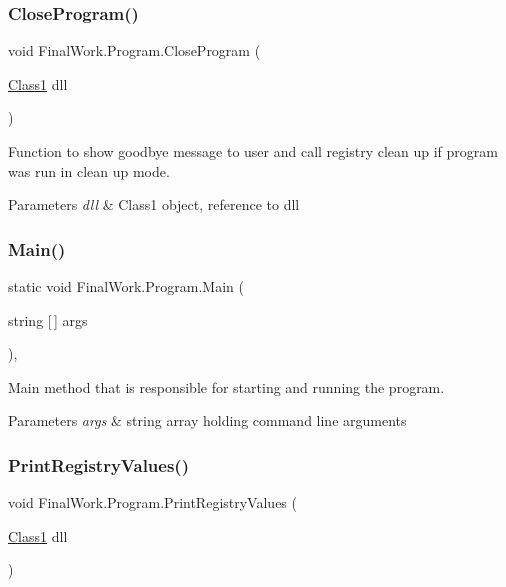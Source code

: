 \subsubsection{\texorpdfstring{Close\+Program()}{CloseProgram()}}
{\footnotesize\ttfamily void Final\+Work.\+Program.\+Close\+Program (\begin{DoxyParamCaption}\item[{\hyperlink{class_projectdll_1_1_class1}{Class1}}]{dll }\end{DoxyParamCaption})\hspace{0.3cm}{\ttfamily [private]}}

Function to show goodbye message to user and call registry clean up if program was run in clean up mode. 
\begin{DoxyParams}{Parameters}
{\em dll} & Class1 object, reference to dll \\
\hline
\end{DoxyParams}
\mbox{\label{class_final_work_1_1_program_af638f741e19f626809c2bf6f2a028e83}} 
\subsubsection{\texorpdfstring{Main()}{Main()}}
{\footnotesize\ttfamily static void Final\+Work.\+Program.\+Main (\begin{DoxyParamCaption}\item[{string \mbox{[}$\,$\mbox{]}}]{args }\end{DoxyParamCaption})\hspace{0.3cm}{\ttfamily [static]}, {\ttfamily [private]}}

Main method that is responsible for starting and running the program. 
\begin{DoxyParams}{Parameters}
{\em args} & string array holding command line arguments \\
\hline
\end{DoxyParams}
\mbox{\label{class_final_work_1_1_program_ae645f04225fb80add67841029cdf6594}} 
\subsubsection{\texorpdfstring{Print\+Registry\+Values()}{PrintRegistryValues()}}
{\footnotesize\ttfamily void Final\+Work.\+Program.\+Print\+Registry\+Values (\begin{DoxyParamCaption}\item[{\hyperlink{class_projectdll_1_1_class1}{Class1}}]{dll }\end{DoxyParamCaption})\hspace{0.3cm}{\ttfamily [private]}}

